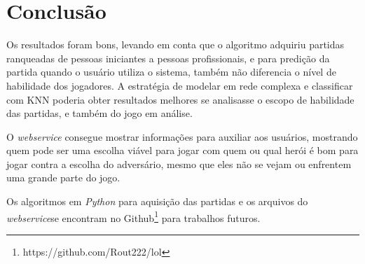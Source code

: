 \chapter{Conclusão}

Os resultados foram bons, levando em conta que o algoritmo adquiriu partidas ranqueadas de pessoas iniciantes a pessoas profissionais, e para predição da partida quando o usuário utiliza o sistema, também não diferencia o nível de habilidade dos jogadores. A estratégia de modelar em rede complexa e classificar com KNN poderia obter resultados melhores se analisasse o escopo de habilidade das partidas, e também do jogo em análise.

O \textit{webservice} consegue mostrar informações para auxiliar aos usuários, mostrando quem pode ser uma escolha viável para jogar com quem ou qual herói é bom para jogar contra a escolha do adversário, mesmo que eles não se vejam ou enfrentem uma grande parte do jogo.

Os algoritmos em \textit{Python} para aquisição das partidas e os arquivos do \textit{webservice}se encontram no Github\footnote{https://github.com/Rout222/lol} para trabalhos futuros.